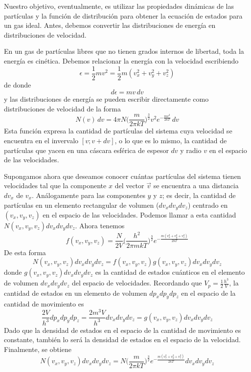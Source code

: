 \documentclass[12pt,a4paper]{article}
\def\e{{\epsilon}} %
\begin{document}
Nuestro objetivo, eventualmente, es utilizar las propiedades dinámicas de las partículas y la función de distribución para obtener la ecuación de estados para un gas ideal. Antes, debemos convertir las distribuciones de energía en distribuciones de velocidad.

En un gas de partículas libres que no tienen grados internos de libertad, toda la energía es cinética. Debemos relacionar la energía con la velocidad escribiendo
\[ \e = \frac{1}{2} m v^{2}=\frac{1}{2}m(v_{x}^{2}+v_{y}^{2}+v_{z}^{2}) \]
de donde
\[ d\e=mv \, dv \]
y las distribuciones de energía se pueden escribir directamente como distribuciones de velocidad de la forma
\[ N(v) \, dv=4 \pi N \bigg( \frac{m}{2 \pi k T} \bigg)^{\frac{3}{2}} v^{2} e^{-\frac{mv^{2}}{2kT}} \, dv \]
Esta función expresa la cantidad de partículas del sistema cuya velocidad se encuentra en el invervalo $[v;v+dv]$, o lo que es lo mismo, la cantidad de partículas que yacen en una cáscara esférica de espesor $dv$ y radio $v$ en el espacio de las velocidades.

Supongamos ahora que deseamos conocer cuántas partículas del sistema tienen velocidades tal que la componente $x$ del vector $\vec{v}$ se encuentra a una distancia $dv_{x}$ de $v_{x}$. Análogamente para las componentes $y$ y $z$; es decir, la cantidad de partículas en un elemento rectangular de volumen ($dv_{x}dv_{y}dv_{z}$) centrado en $(v_{x},v_{y},v_{z})$ en el espacio de las velocidades. Podemos llamar a esta cantidad $N(v_{x},v_{y},v_{z})dv_{x}dv_{y}dv_{z}$. Ahora tenemos
\[ f(v_{x},v_{y},v_{z})=\frac{N}{2V} \bigg( \frac{h^{2}}{2 \pi m k T} \bigg)^{\frac{3}{2}} e^{-\frac{m(v_{x}^{2}+v_{y}^{2}+v_{z}^{2})}{2kT}} \]
De esta forma
\[ N(v_{x},v_{y},v_{z})dv_{x}dv_{y}dv_{z}=f(v_{x},v_{y},v_{z})g(v_{x},v_{y},v_{z})dv_{x}dv_{y}dv_{z} \]
donde $g(v_{x},v_{y},v_{z})dv_{x}dv_{y}dv_{z}$ es la cantidad de estados cuánticos en el elemento de volumen $dv_{x}dv_{y}dv_{z}$ del espacio de velocidades. Recordando que $V_{p}=\frac{1}{2} \frac{h^{3}}{V}$, la cantidad de estados en un elemento de volumen $dp_{x}dp_{y}dp_{z}$ en el espacio de la cantidad de movimiento es
\[ \frac{2V}{h^{3}}dp_{x}dp_{y}dp_{z}=\frac{2m^{3}V}{h^{3}}dv_{x}dv_{y}dv_{z}=g(v_{x},v_{y},v_{z})dv_{x}dv_{y}dv_{z} \]
Dado que la densidad de estados en el espacio de la cantidad de movimiento es constante, también lo será la densidad de estados en el espacio de la velocidad. Finalmente, se obtiene
\[ N(v_{x},v_{y},v_{z})dv_{x}dv_{y}dv_{z}=N \bigg( \frac{m}{2\pi k T} \bigg)^{\frac{3}{2}} e^{-\frac{m(v_{x}^{2}+v_{y}^{2}+v_{z}^{2})}{2kT}} dv_{x}dv_{y}dv_{z} \]
\end{document}
